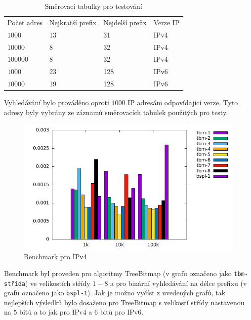 \begin{table}[!htbp]
	\center
    \begin{tabular}{|l|l|l|l|}
    \hline
    Počet adres & Nejkratší prefix & Nejdelší prefix & Verze IP \\ \hhline{|=|=|=|=|}
    $1000$ & 13 & 31 & IPv4 \\ \hline
    $10000$ & 8 & 32 & IPv4 \\ \hline
    $100000$ & 8 & 32 & IPv4 \\ \hline
    $1000$ & 23 & 128 & IPv6 \\ \hline
    $10000$ & 19 & 128 & IPv6 \\ \hline
    \end{tabular}
	\caption{Směrovací tabulky pro testování}
    \label{tab:lpm-input}
\end{table}

Vyhledávání bylo prováděno oproti $1000$ IP adresám odpovídající verze. Tyto adresy byly vybrány
ze záznamů směrovacích tabulek použitých pro testy.

\begin{figure}[H]
	\centering
	\includegraphics[scale=1]{fig/lpm-ipv4.pdf}
	\caption{Benchmark pro IPv4}
    \label{fig:lpm-ipv4}
\end{figure}

Benchmark byl proveden pro algoritmy TreeBitmap (v grafu označeno jako \texttt{tbm-střída}) ve velikostích střídy $1-8$ a pro binární vyhledávání na délce prefixu (v grafu označeno jako \texttt{bspl-1}).
Jak je možno vyčíst z uvedených grafů, tak nejlepších výsledků bylo dosaženo pro TreeBitmap s velikostí
střídy nastavenou na $5$ bitů a to jak pro IPv4 a $6$ bitů pro IPv6.

